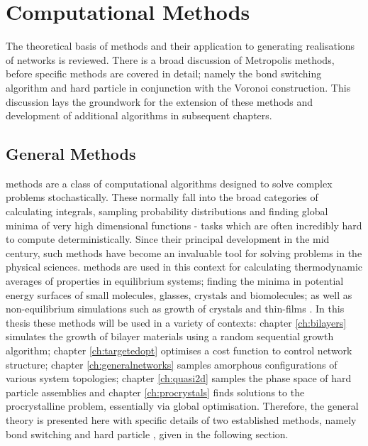 \chapter{Computational Methods}
\label{ch:compmethods}

\begin{chapterabstract}
The theoretical basis of \mc{} methods and their application to generating realisations of \td{} networks is reviewed.
There is a broad discussion of Metropolis \mc{} methods, before specific methods are covered in detail; namely the bond switching algorithm and hard particle \mc{} in conjunction with the Voronoi construction.
This discussion lays the groundwork for the extension of these methods and development of additional \mc{} algorithms in subsequent chapters.
\end{chapterabstract}

\section{General \mc{} Methods}
\label{sec:mc}

\mc{} methods are a class of computational algorithms designed to solve complex problems stochastically.
These normally fall into the broad categories of calculating integrals, sampling probability distributions and finding global minima of very high dimensional functions \-- tasks which are often incredibly hard to compute deterministically.
Since their principal development in the mid\th{} century, such methods have become an invaluable tool for solving problems in the physical sciences.
\mc{} methods are used in this context for calculating thermodynamic averages of properties in equilibrium systems; finding the minima in potential energy surfaces of small molecules, glasses, crystals and biomolecules; as well as non\--equilibrium simulations such as growth of crystals and thin\--films \cite{Landau2014,Wales1999,Levi1997,Ratsch2003,Kob1999,Jensen1999}.
In this thesis these \mc{} methods  will be used in a variety of contexts: chapter \ref{ch:bilayers} simulates the growth of bilayer materials using  a random sequential growth algorithm; chapter \ref{ch:targetedopt} optimises a cost function to control network structure; chapter \ref{ch:generalnetworks} samples amorphous configurations of various system topologies; chapter \ref{ch:quasi2d} samples the phase space of hard particle assemblies and chapter \ref{ch:procrystals} finds solutions to the procrystalline problem, essentially via global optimisation.
Therefore, the general theory is presented here with specific details of two established methods, namely bond switching and hard particle \mc{}, given in the following section.

